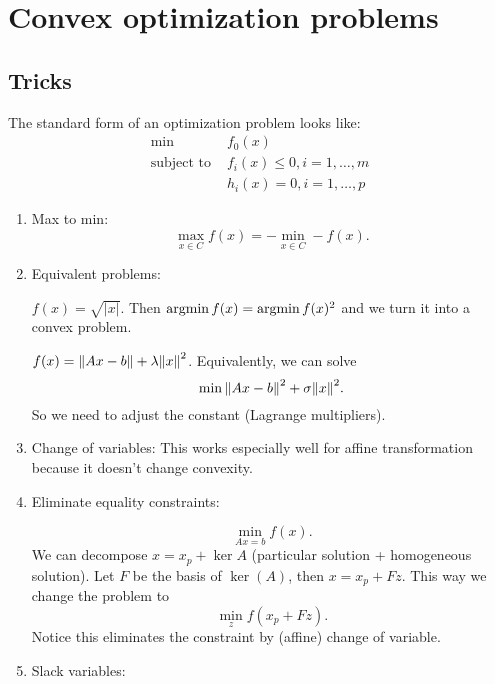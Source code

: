 \documentclass[class=article,crop=false]{standalone}
\begin{document}
\newpage
\section{Convex optimization problems}
\subsection{Tricks}
The standard form of an optimization problem looks like:
\begin{align*}
\min\ &f_0(x)\\
\text{subject to } &f_i(x) \leq 0, i = 1,\ldots,m \\
&h_i(x) = 0 , i = 1,\ldots,p
\end{align*}
\begin{enumerate}[label=\arabic*)]
\item Max to min:
\[
	 \max_{x \in C} f(x) = - \min_{x \in C} -f(x)
.\] 
\item Equivalent problems:
\begin{eg}
	$ f(x) = \sqrt{|x|} $. Then $ \operatorname*{argmin} f(x) = \operatorname*{argmin} f(x)^2$ and we turn it into a convex problem.
\end{eg}

\begin{eg}
	$ f(x) = {\left\lVert{ Ax-b}\right\rVert} + \lambda {\left\lVert{ x}\right\rVert}^2 $. Equivalently, we can solve
	\[
	\min {\left\lVert{ Ax- b}\right\rVert}^2 + \sigma {\left\lVert{ x}\right\rVert}^2  
	.\] 
	So we need to adjust the constant (Lagrange multipliers).
\end{eg}

\item Change of variables:
This works especially well for affine transformation because it doesn't change convexity.
	\item Eliminate equality constraints:
		\begin{eg}
		\[
			\underset{ Ax=b}{ \min} f(x)
		.\] 
		We can decompose $ x = x_p + \ker A$ (particular solution + homogeneous solution). Let  $ F$ be the basis of  $ \ker(A)$, then  $ x= x_p + F z$. This way we change the problem to
		\[
			\min_z f(x_p +F z)
		.\]
		Notice this eliminates the constraint by (affine) change of variable.
		\end{eg}
	\item Slack variables:


\end{enumerate}
\end{document}
